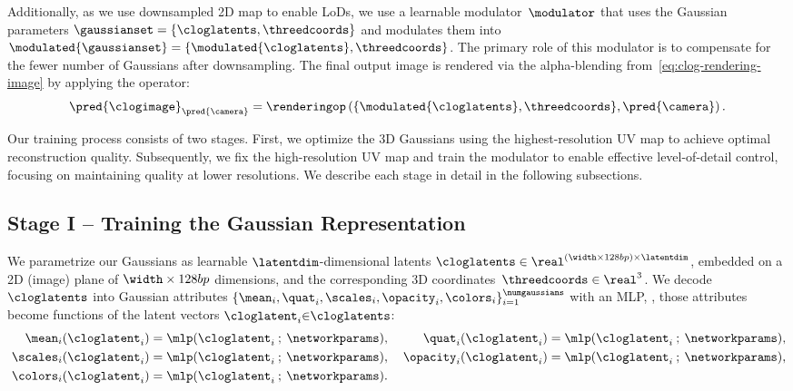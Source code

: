     Additionally, as we use downsampled 2D map to enable LoDs, we use a learnable
    modulator~$\modulator$ that uses the Gaussian parameters
    $\gaussianset=\{\cloglatents, \threedcoords\}$ and modulates them into
    $\modulated{\gaussianset}=\{\modulated{\cloglatents},\threedcoords\}$.
    The primary role of this modulator is to compensate for the fewer number of
    Gaussians after downsampling.
    The final output image is rendered via the alpha-blending from~\cref{eq:clog-rendering-image} by applying the operator:
    \begin{equation}
      \pred{\clogimage}_{\pred{\camera}} = \renderingop\left(\{\modulated{\cloglatents}, \threedcoords\}, \pred{\camera}\right).
    \end{equation}

    Our training process consists of two stages.
    First, we optimize the 3D Gaussians using the highest-resolution UV map to
    achieve optimal reconstruction quality.
    Subsequently, we fix the high-resolution UV map and train the modulator to
    enable effective level-of-detail control, focusing on maintaining quality at
    lower resolutions.
    We describe each stage in detail in the following subsections.

  \subsection{Stage I -- Training the Gaussian Representation}
    We parametrize our Gaussians as learnable $\latentdim$-dimensional latents
    $\cloglatents \in \real^{(\width \times \height)\times\latentdim}$, embedded
    on a 2D (image) plane of $\width \times \height$ dimensions, and the
    corresponding 3D coordinates~$\threedcoords \in \real^3$.
    We decode $\cloglatents$ into Gaussian attributes $\{\mean_i, \quat_i, \scales_i, \opacity_i, \colors_i \}_{i=1}^\numgaussians$ with an MLP, \ie, those attributes become functions of the latent vectors $\cloglatent_i{\in}\cloglatents$:
    \begin{equation}
      \label{eq:clog-decoders}
      \begin{aligned}
        \mean_i(\cloglatent_i)    & = \mlp(\cloglatent_i\:;\:\networkparams),
        \:
                                  &
        \quat_i(\cloglatent_i)    & =\mlp(\cloglatent_i\:;\:\networkparams),
        \\
        \:
        \scales_i(\cloglatent_i)  & =\mlp(\cloglatent_i\:;\:\networkparams),
        \:
                                  &
        \opacity_i(\cloglatent_i) & =\mlp(\cloglatent_i\:;\:\networkparams) ,
        \\
        \colors_i(\cloglatent_i)  & = \mlp(\cloglatent_i\:; \:\networkparams).
      \end{aligned}
    \end{equation}

